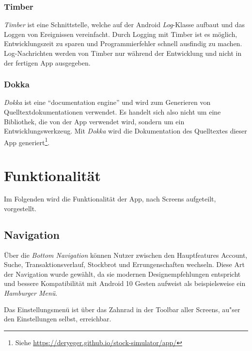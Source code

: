 \documentclass[a4paper]{article}
\begin{document}
\subsubsection{Timber}
\label{subsubsec:technologies:bibs:timber}
\textit{Timber} ist eine Schnittstelle, welche auf der Android \textit{Log}-Klasse aufbaut und das Loggen von Ereignissen vereinfacht.
Durch Logging mit Timber ist es möglich, Entwicklungszeit zu sparen und Programmierfehler schnell ausfindig zu machen.
Log-Nachrichten werden von Timber nur während der Entwicklung und nicht in der fertigen App ausgegeben.


\subsubsection{Dokka}
\label{subsubsec:technologies:bibs:dokka}
\textit{Dokka} ist eine "`documentation engine"' \autocite{dokka} und wird zum Generieren von Quelltextdokumentationen verwendet.
Es handelt sich also nicht um eine Bibliothek, die von der App verwendet wird, sondern um ein Entwicklungswerkzeug.
Mit \textit{Dokka}  wird die Dokumentation des Quelltextes dieser App generiert\footnote{Siehe \url{https://deryeger.github.io/stock-simulator/app/}}.


\section{Funktionalität}
\label{sec:functionality}
Im Folgenden wird die Funktionalität der App, nach Screens aufgeteilt, vorgestellt.


\subsection{Navigation}
\label{subsec:functionality:navigation}
Über die \textit{Bottom Navigation} können Nutzer zwischen den Hauptfeatures Account, Suche, Transaktionsverlauf, Stockbrot und Errungenschaften wechseln.
Diese Art der Navigation wurde gewählt, da sie modernen Designempfehlungen \autocite{bottom_navigation} entspricht und bessere Kompatibilität mit Android 10 Gesten aufweist als beispielsweise ein \textit{Hamburger Menü}.

Das Einstellungsmenü ist über das Zahnrad in der Toolbar aller Screens, au"ser den Einstellungen selbst, erreichbar.
\end{document}
